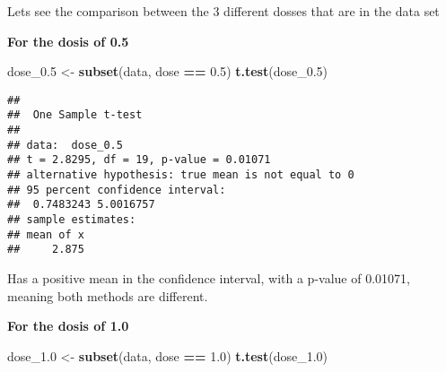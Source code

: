\documentclass[
]{article}
\newenvironment{Shaded}{\begin{snugshade}}{\end{snugshade}}
\newcommand{\DecValTok}[1]{\textcolor[rgb]{0.00,0.00,0.81}{#1}}
\newcommand{\FloatTok}[1]{\textcolor[rgb]{0.00,0.00,0.81}{#1}}
\newcommand{\KeywordTok}[1]{\textcolor[rgb]{0.13,0.29,0.53}{\textbf{#1}}}
\newcommand{\NormalTok}[1]{#1}
\newcommand{\OperatorTok}[1]{\textcolor[rgb]{0.81,0.36,0.00}{\textbf{#1}}}
\newcommand{\StringTok}[1]{\textcolor[rgb]{0.31,0.60,0.02}{#1}}
\begin{document}
Lets see the comparison between the 3 different dosses that are in the
data set

\begin{Shaded}
\end{Shaded}

\textbf{For the dosis of 0.5}

\begin{Shaded}
\begin{Highlighting}[]
\NormalTok{dose_}\FloatTok{0.5}\NormalTok{ <-}\StringTok{ }\KeywordTok{subset}\NormalTok{(data, dose }\OperatorTok{==}\StringTok{ }\FloatTok{0.5}\NormalTok{)}
\KeywordTok{t.test}\NormalTok{(dose_}\FloatTok{0.5}\NormalTok{)}
\end{Highlighting}
\end{Shaded}

\begin{verbatim}
## 
##  One Sample t-test
## 
## data:  dose_0.5
## t = 2.8295, df = 19, p-value = 0.01071
## alternative hypothesis: true mean is not equal to 0
## 95 percent confidence interval:
##  0.7483243 5.0016757
## sample estimates:
## mean of x 
##     2.875
\end{verbatim}

Has a positive mean in the confidence interval, with a p-value of
0.01071, meaning both methods are different.

\textbf{For the dosis of 1.0}

\begin{Shaded}
\begin{Highlighting}[]
\NormalTok{dose_}\FloatTok{1.0}\NormalTok{ <-}\StringTok{ }\KeywordTok{subset}\NormalTok{(data, dose }\OperatorTok{==}\StringTok{ }\FloatTok{1.0}\NormalTok{)}
\KeywordTok{t.test}\NormalTok{(dose_}\FloatTok{1.0}\NormalTok{)}
\end{Highlighting}
\end{Shaded}
\end{document}
